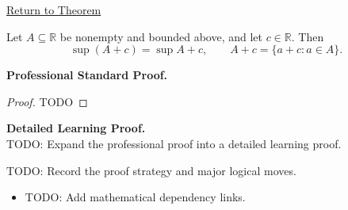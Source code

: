 \newpage
{}
\label{prf:translation-invariance-supremum}

\begin{remark*}[Return]
\hyperref[thm:translation-invariance-supremum]{Return to Theorem}
\end{remark*}

\begin{theorem*}
Let $A\subseteq\mathbb{R}$ be nonempty and bounded above, and let $c\in\mathbb{R}$. Then
\[
  \sup(A+c)=\sup A+c,
  \qquad
  A+c=\{a+c:a\in A\}.
\]
\end{theorem*}

\textbf{Professional Standard Proof.}~\\
\begin{proof}
TODO
\end{proof}

\textbf{Detailed Learning Proof.}~\\
TODO: Expand the professional proof into a detailed learning proof.

\begin{remark*}
TODO: Record the proof strategy and major logical moves.
\end{remark*}

\begin{dependencies}
\begin{itemize}
  \item TODO: Add mathematical dependency links.
\end{itemize}
\end{dependencies}
